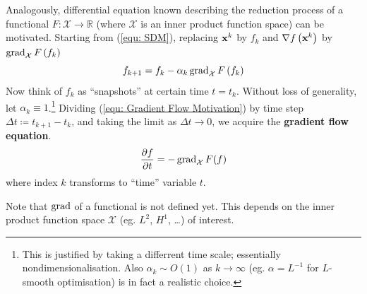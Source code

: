 \documentclass[../dissertation.tex]{subfiles}
\begin{document}
Analogously, differential equation known describing the reduction process of a functional $F:\mathcal{X} \rightarrow \mathbb{R}$ (where $\mathcal{X}$ is an inner product function space) can be motivated.
Starting from (\ref{equ: SDM}), replacing $\mathbf{x}^{k}$ by $f_k$ and $\nabla f\left( \mathbf{x}^k \right)$ by $\operatorname{grad}_{\mathcal{X}} F\left( f_k \right)$
\begin{equation}
    f_{k+1} = f_k - \alpha_k \operatorname{grad}_{\mathcal{X}} F \left( f_k \right)
    \label{equ: Gradient Flow Motivation}
\end{equation}
Now think of $f_k$ as ``snapshots'' at certain time $t = t_k$.
Without loss of generality, let $\alpha_k \equiv 1$.\footnote{
This is justified by taking a differrent time scale; essentially nondimensionalisation.
Also $\alpha_k \sim O (1)$ as $k \rightarrow \infty$ (eg. $\alpha = L^{-1}$ for $L$-smooth optimisation) is in fact a realistic choice.}
Dividing (\ref{equ: Gradient Flow Motivation}) by time step $\Delta t \coloneqq t_{k+1} - t_k$,
and taking the limit as $\Delta t \rightarrow 0$,
we acquire the \textbf{gradient flow equation}\cite{YSC2021}.
\begin{equation}
    \frac{\partial f}{\partial t} = - \operatorname{grad}_{\mathcal{X}} F (f)
\end{equation}
where index $k$ transforms to ``time'' variable $t$.

Note that $\operatorname{grad}$ of a functional is not defined yet. This depends on the inner product function space $\mathcal{X}$ (eg. $L^2$, $H^1$, \ldots) of interest.
\end{document}
